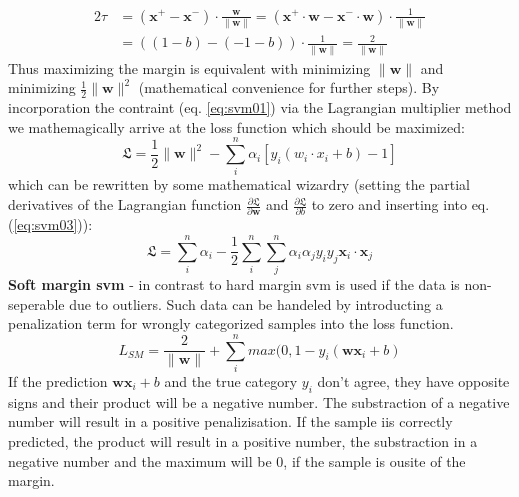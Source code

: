 \fi
\begin{equation}
	\label{eq:svm02}
	\begin{aligned} 
		2\tau &= (\mathbf{x}^+ - \mathbf{x}^-) \cdot \frac{\mathbf{w}}{\|\mathbf{w}\|} 
			= (\mathbf{x}^+ \cdot \mathbf{w} - \mathbf{x}^-\cdot \mathbf{w} ) \cdot \frac{1}{\|\mathbf{w}\|} \\
			&= ( (1-b) - (-1-b) ) \cdot \frac{1}{\|\mathbf{w}\|} 
			= \frac{2}{\|\mathbf{w}\|}
	\end{aligned}
\end{equation}
Thus maximizing the margin is equivalent with minimizing $\|\mathbf{w}\|$ and minimizing $\frac{1}{2}\|\mathbf{w}\|^2$ (mathematical convenience for further steps).
By incorporation the contraint (eq. \ref{eq:svm01}) via the Lagrangian multiplier method we 
mathemagically arrive at the loss function which should be maximized: 
\begin{equation}
	\label{eq:svm03}
	\mathfrak{L} = \frac{1}{2} \|\mathbf{w}\|^2 - \sum_i^n \alpha_i [ y_i ( w_i \cdot x_i + b) -1 ] 
\end{equation}
which can be rewritten by some mathematical wizardry (setting the partial derivatives of the Lagrangian function
$\frac{\partial \mathfrak{L}}{\partial \mathbf{w}}$ and $\frac{\partial \mathfrak{L}}{\partial b}$ 
to zero and inserting into eq. (\ref{eq:svm03}))\cite{winston1992artificial,cherkassky1998learning}: 
\begin{equation}
	\label{eq:svm04}
	\mathfrak{L} = \sum_i^n \alpha_i - \frac{1}{2} \sum_i^n \sum_j^n \alpha_i \alpha_j y_i y_j \mathbf{x}_i \cdot \mathbf{x}_j 
\end{equation}
%
\textbf{Soft margin \gls{svm}} - in contrast to hard margin \gls{svm} is used if the data is non-seperable due to outliers\cite{cortes1995support}.
Such data can be handeled by introducting a penalization term for wrongly categorized samples into the loss function. 
\begin{equation}
	\label{eq:svm-soft}
	L_{SM} = \frac{2} {\|\mathbf{w}\|} + \sum_i^n max(0, 1- y_i ( \mathbf{w} \mathbf{x}_i + b ) 
\end{equation}
If the prediction $\mathbf{w}\mathbf{x}_i+b$ and the true category $y_i$ don't agree, 
they have opposite signs and their product will be a negative number.
The substraction of a negative number will result in a positive penalizisation. 
If the sample iis correctly predicted, the product will result in a positive number, 
the substraction in a negative number and the maximum will be 0, if the sample is ousite of the margin. 


